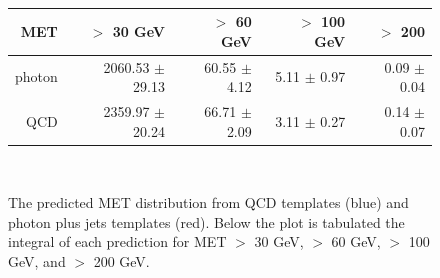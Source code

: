 \begin{figure}[hbt]
  \begin{center}
	\\ \medskip
    \begin{tabular}{r|r|r|r|r}
      MET    & $>$ 30 GeV       & $>$ 60 GeV        & $>$ 100 GeV       & $>$ 200  \\ \hline

photon & 2060.53 $\pm$  29.13 &  60.55 $\pm$   4.12 &   5.11 $\pm$   0.97 &   0.09 $\pm$   0.04 \\
   QCD & 2359.97 $\pm$  20.24 &  66.71 $\pm$   2.09 &   3.11 $\pm$   0.27 &   0.14 $\pm$   0.07 \\


    \end{tabular}
	\\ \medskip
    \caption{The predicted MET distribution from QCD templates (blue) and photon plus jets
	  templates (red). %
	  Below the plot is tabulated the integral of each prediction for
	  MET $>$ 30 GeV, $>$ 60 GeV, $>$ 100 GeV, and $>$ 200 GeV. 
	}
    \label{fig:comptemp}
  \end{center}
\end{figure}
